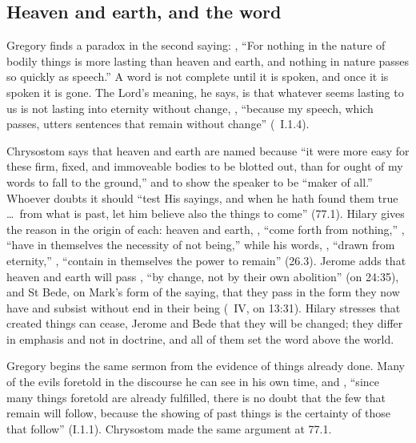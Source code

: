 \subsection{Heaven and earth, and the word}
\label{sec:words-word}

Gregory finds a paradox in the second saying: , ``For nothing in the nature of bodily things
is more lasting than heaven and earth, and nothing in nature passes so quickly
as speech.'' A word is not complete until it is spoken, and once it is spoken it
is gone. The Lord's meaning, he says, is that whatever seems lasting to us is
not lasting into eternity without change, , ``because my speech,
which passes, utters sentences that remain without change''
(~I.1.4).

Chrysostom says that heaven and earth are named because ``it were more easy for
these firm, fixed, and immoveable bodies to be blotted out, than for ought of
my words to fall to the ground,'' and to show the speaker to be ``maker of
all.'' Whoever doubts it should ``test His sayings, and when he hath found them
true \dots\ from what is past, let him believe also the things to come''
(77.1). Hilary gives the reason in the origin of each: heaven and earth,
, ``come forth from nothing,'' , ``have in themselves the necessity of not being,''
while his words, , ``drawn from eternity,''
, ``contain in themselves the
power to remain'' (26.3). Jerome adds that heaven and earth will pass
, ``by change, not by their own
abolition'' (on 24:35), and St Bede, on Mark's form of the saying, that they
pass in the form they now have and subsist without end in their being (~IV, on 13:31). Hilary stresses that created things
can cease, Jerome and Bede that they will be changed; they differ in emphasis
and not in doctrine, and all of them set the word above the world.

Gregory begins the same sermon from the evidence of things already done. Many
of the evils foretold in the discourse he can see in his own time, and
, ``since many things foretold are already fulfilled, there is no
doubt that the few that remain will follow, because the showing of past things
is the certainty of those that follow'' (I.1.1). Chrysostom made the same
argument at 77.1.


